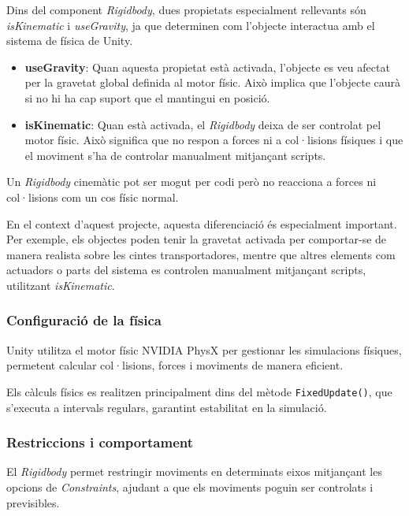 \documentclass[12pt,a4paper]{report}
\begin{document}
Dins del component \textit{Rigidbody}, dues propietats especialment rellevants són \textit{isKinematic} i \textit{useGravity}, ja que determinen com l'objecte interactua amb el sistema de física de Unity.

\begin{itemize}

\item \textbf{useGravity}:  
Quan aquesta propietat està activada, l'objecte es veu afectat per la gravetat global definida al motor físic. Això implica que l'objecte caurà si no hi ha cap suport que el mantingui en posició.

\item \textbf{isKinematic}:  
Quan està activada, el \textit{Rigidbody} deixa de ser controlat pel motor físic. Això significa que no respon a forces ni a col·lisions físiques i que el moviment s'ha de controlar manualment mitjançant scripts.

\end{itemize}

Un \textit{Rigidbody} cinemàtic pot ser mogut per codi però no reacciona a forces ni col·lisions com un cos físic normal. \cite{UnityColliders}

En el context d'aquest projecte, aquesta diferenciació és especialment important. Per exemple, els objectes poden tenir la gravetat activada per comportar-se de manera realista sobre les cintes transportadores, mentre que altres elements com actuadors o parts del sistema es controlen manualment mitjançant scripts, utilitzant \textit{isKinematic}.


\subsubsection{Configuració de la física}

Unity utilitza el motor físic NVIDIA PhysX \cite{UnityPhysics} per gestionar les simulacions físiques, permetent calcular col·lisions, forces i moviments de manera eficient.


Els càlculs físics es realitzen principalment dins del mètode \texttt{FixedUpdate()}, que s'executa a intervals regulars, garantint estabilitat en la simulació.

\subsubsection{Restriccions i comportament}

El \textit{Rigidbody} permet restringir moviments en determinats eixos mitjançant les opcions de \textit{Constraints}, ajudant a que els moviments poguin ser controlats i previsibles.
\end{document}
